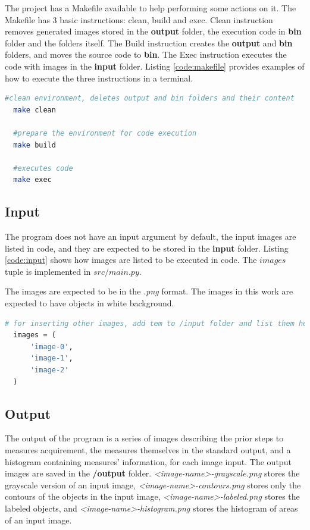 \documentclass[]{IEEEtran}
\begin{document}
The project has a Makefile available to help performing some actions on it. The Makefile has 3 basic instructions: clean, build and exec. Clean instruction removes generated images stored in the \textbf{output} folder, the execution code in \textbf{bin} folder and the folders itself. The Build instruction creates the \textbf{output} and \textbf{bin} folders, and moves the source code to \textbf{bin}. The Exec instruction executes the code with images in the \textbf{input} folder. Listing \ref{code:makefile} provides examples of how to execute the three instructions in a terminal.
\begin{lstlisting}[language=sh, caption={Makefile usage example}, label={code:makefile}]
  #clean environment, deletes output and bin folders and their content
  make clean
  
  #prepare the environment for code execution
  make build 

  #executes code
  make exec
\end{lstlisting}

\subsection{Input}

The program does not have an input argument by default, the input images are listed in code, and they are expected to be stored in the \textbf{input} folder. Listing \ref{code:input} shows how images are listed to be executed in code. The $images$ tuple is implemented in $src/main.py$.
\par The images are expected to be in the \textit{.png} format. The images in this work are expected to have objects in white background.

\begin{lstlisting}[language=Python, caption={Input images inside code}, label={code:input}]
  # for inserting other images, add tem to /input folder and list them here
  images = (
      'image-0',
      'image-1',
      'image-2'
  )
\end{lstlisting}

\subsection{Output}
The output of the program is a series of images describing the prior steps to measures acquirement, the measures themselves in the standard output, and a histogram containing measures' information, for each image input. The output images are saved in the \textbf{/output} folder. \textit{\textless image-name\textgreater-grayscale.png} stores the grayscale version of an input image, \textit{\textless image-name\textgreater-contours.png} stores only the contours of the objects in the input image, \textit{\textless image-name\textgreater-labeled.png} stores the labeled objects, and \textit{\textless image-name\textgreater-histogram.png} stores the histogram of areas of an input image.
\end{document}
